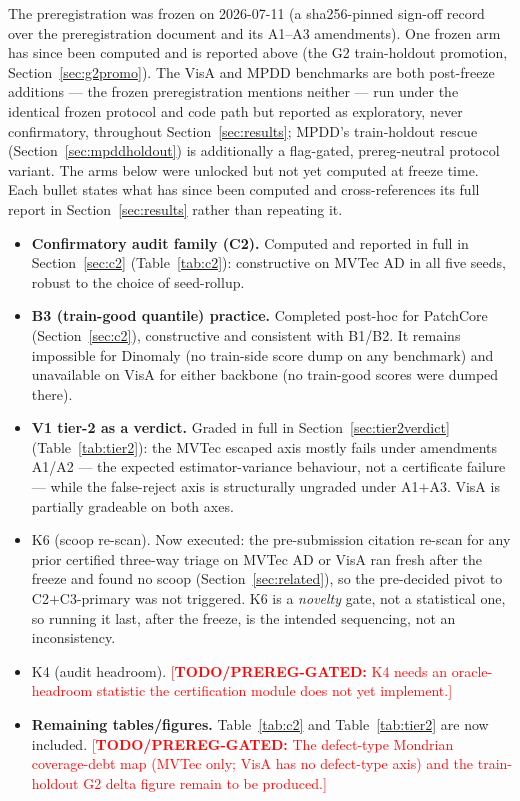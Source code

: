 \documentclass[11pt]{article}
\newcommand{\todo}[1]{\textcolor{red}{[\textbf{TODO/PREREG-GATED:} #1]}}
\begin{document}
The preregistration was frozen on 2026-07-11 (a sha256-pinned sign-off record over the
preregistration document and its A1--A3 amendments). One frozen arm
has since been computed and is reported above (the G2 train-holdout promotion,
Section~\ref{sec:g2promo}). The VisA and MPDD benchmarks are both post-freeze additions ---
the frozen preregistration mentions neither --- run under the identical frozen protocol and
code path but reported as exploratory, never confirmatory, throughout
Section~\ref{sec:results}; MPDD's train-holdout rescue (Section~\ref{sec:mpddholdout}) is
additionally a flag-gated, prereg-neutral protocol variant. The arms below were unlocked but not
yet computed at freeze time. Each bullet states what has since been computed and cross-references
its full report in Section~\ref{sec:results} rather than repeating it.

\begin{itemize}
  \item \textbf{Confirmatory audit family (C2).} Computed and reported in full in
        Section~\ref{sec:c2} (Table~\ref{tab:c2}): constructive on MVTec AD in all five seeds,
        robust to the choice of seed-rollup.
  \item \textbf{B3 (train-good quantile) practice.} Completed post-hoc for PatchCore
        (Section~\ref{sec:c2}), constructive and consistent with B1/B2. It remains impossible for
        Dinomaly (no train-side score dump on any benchmark) and unavailable on VisA for either
        backbone (no train-good scores were dumped there).
  \item \textbf{V1 tier-2 as a verdict.} Graded in full in Section~\ref{sec:tier2verdict}
        (Table~\ref{tab:tier2}): the MVTec escaped axis mostly fails under amendments A1/A2 ---
        the expected estimator-variance behaviour, not a certificate failure --- while the
        false-reject axis is structurally ungraded under A1$+$A3. VisA is partially gradeable on
        both axes.
  \item K6 (scoop re-scan). Now executed: the pre-submission citation re-scan for any prior
        certified three-way triage on MVTec AD or VisA ran fresh after the freeze and found no scoop
        (Section~\ref{sec:related}), so the pre-decided pivot to C2$+$C3-primary was not triggered.
        K6 is a \emph{novelty} gate, not a statistical one, so running it last, after the freeze, is
        the intended sequencing, not an inconsistency.
  \item K4 (audit headroom).
        \todo{K4 needs an oracle-headroom statistic the certification module does not yet implement.}
  \item \textbf{Remaining tables/figures.} Table~\ref{tab:c2} and Table~\ref{tab:tier2} are now
        included. \todo{The defect-type Mondrian coverage-debt map (MVTec only; VisA has no
        defect-type axis) and the train-holdout G2 delta figure remain to be produced.}
\end{itemize}
\end{document}
